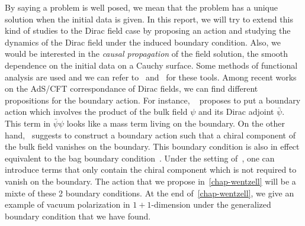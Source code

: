 By saying a problem is well posed, we mean that the problem has a unique solution when the initial data is given.
In this report, we will try to extend this kind of studies to the Dirac field case by proposing an action and studying the dynamics of the Dirac field under the induced boundary condition.
Also, we would be interested in the \textit{causal propagation} of the field solution, \ie the smooth dependence on the initial data on a Cauchy surface.
Some methods of functional analysis are used and we can refer to~\cite{Reed1981} and~\cite{Reed1975} for these tools. 
%
Among recent works on the AdS/CFT correspondance of Dirac fields, we can find different propositions for the boundary action.
For instance, 
~\cite{Henningson1998} proposes to put a boundary action which involves the product of the bulk field $\psi$ and its Dirac adjoint $\bar{\psi}$. 
This term in $\bar{\psi}\psi$ looks like a mass term living on the boundary.
On the other hand,~\cite{Contino2005} suggests to construct a boundary action such that a chiral component of the bulk field vanishes on the boundary.
This boundary condition is also in effect equivalent to the bag boundary condition~\cite{Chodos1974}.
Under the setting of~\cite{Contino2005}, one can introduce terms that only contain the chiral component which is not required to vanish on the boundary.
The action that we propose in~\cref{chap-wentzell} will be a mixte of these 2 boundary conditions.
At the end of~\cref{chap-wentzell}, we give an example of vacuum polarization in $1+1$-dimension under the generalized boundary condition that we have found.
